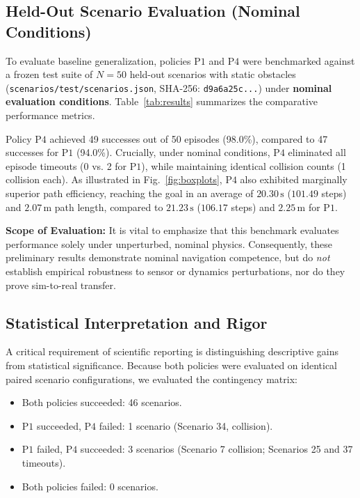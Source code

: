 \documentclass[conference]{IEEEtran}
\begin{document}
\subsection{Held-Out Scenario Evaluation (Nominal Conditions)}
To evaluate baseline generalization, policies $\text{P1}$ and $\text{P4}$ were benchmarked against a frozen test suite of $N=50$ held-out scenarios with static obstacles (\texttt{scenarios/test/scenarios.json}, SHA-256: \texttt{d9a6a25c...}) under \textbf{nominal evaluation conditions}. Table~\ref{tab:results} summarizes the comparative performance metrics.

Policy $\text{P4}$ achieved 49 successes out of 50 episodes (98.0\%), compared to 47 successes for $\text{P1}$ (94.0\%). Crucially, under nominal conditions, $\text{P4}$ eliminated all episode timeouts (0 vs. 2 for $\text{P1}$), while maintaining identical collision counts (1 collision each). As illustrated in Fig.~\ref{fig:boxplots}, $\text{P4}$ also exhibited marginally superior path efficiency, reaching the goal in an average of $20.30\,\text{s}$ ($101.49$ steps) and $2.07\,\text{m}$ path length, compared to $21.23\,\text{s}$ ($106.17$ steps) and $2.25\,\text{m}$ for $\text{P1}$.

\textbf{Scope of Evaluation:} It is vital to emphasize that this benchmark evaluates performance solely under unperturbed, nominal physics. Consequently, these preliminary results demonstrate nominal navigation competence, but do \textit{not} establish empirical robustness to sensor or dynamics perturbations, nor do they prove sim-to-real transfer.

\subsection{Statistical Interpretation and Rigor}
A critical requirement of scientific reporting is distinguishing descriptive gains from statistical significance. Because both policies were evaluated on identical paired scenario configurations, we evaluated the contingency matrix:
\begin{itemize}
    \item Both policies succeeded: 46 scenarios.
    \item $\text{P1}$ succeeded, $\text{P4}$ failed: 1 scenario (Scenario 34, collision).
    \item $\text{P1}$ failed, $\text{P4}$ succeeded: 3 scenarios (Scenario 7 collision; Scenarios 25 and 37 timeouts).
    \item Both policies failed: 0 scenarios.
\end{itemize}
\end{document}
